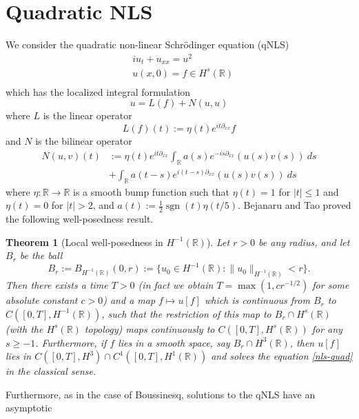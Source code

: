 \documentclass[12pt,reqno]{amsart}
\numberwithin{equation}{section}  %
\newcommand{\rr}{\mathbb{R}}
\newtheorem{theorem}{Theorem}[section]
\def\sgn{\operatorname{sgn}}
\newcommand{\R}{\mathbb{R}}
\begin{document}
\section{Quadratic NLS}
%
  We consider the quadratic non-linear Schr\"odinger equation (qNLS)
\begin{equation}\label{nls-quad}
\begin{split}
& i u_t + u_{xx} = u^2\\
& u(x, 0) = f \in H^s(\R) \\
\end{split}
\end{equation}
which has the localized integral formulation 
\begin{equation}\label{uln-2}
 u = L(f) + N(u,u)
 \end{equation}
where $L$ is the linear operator
\begin{equation}\label{Ldef}
  L(f)(t) := \eta(t) e^{it\partial_{xx}} f
\end{equation}
and $N$ is the bilinear operator
\begin{equation}\label{Ndef}
\begin{split}
N(u,v)(t) &:=
\eta(t) e^{it\partial_{xx}} \int_\R a(s) e^{-is\partial_{xx}}(u(s)v(s))\ ds\\
&+ \int_\R a(t-s) e^{i(t-s)\partial_{xx}}(u(s) v(s))\ ds
\end{split}
\end{equation}
%
where $\eta: \R \to \R$ is a smooth bump function such that $\eta(t) = 1$ for
$|t| \leq 1$ and $\eta(t) = 0$ for $|t| > 2$, and $a(t) := \frac{1}{2}
\sgn(t)\eta(t/5)$.  
%
Bejanaru and Tao proved the following well-posedness result.
\begin{theorem}[Local well-posedness in $H^{-1}(\R)$]\label{lwp}
Let $r > 0$ be any radius, and let $B_r$ be the ball
$$ B_r := B_{H^{-1}(\R)}(0,r) := \{ u_0 \in H^{-1}(\R): \| u_0 \|_{H^{-1}(\R)} < r \}.$$
Then there exists a time $T > 0$ (in fact we obtain $T = \max(1, c r^{-1/2} )$ for some absolute constant $c>0$)
and a map $f \mapsto u[f]$ which is continuous from $B_r$ to $C([0,T],
H^{-1}(\rr))$, such that the
restriction of this map to $B_r \cap H^s(\R)$ (with the $H^s(\R)$ topology) maps continuously 
to $C([0,T], H^s(\rr))$ for any $s \geq -1$.  Furthermore, if $f$ lies in
a smooth space, say $B_r \cap H^3(\R)$, then $u[f]$ lies in $C([0, T], H^3) \cap
C^1([0,T], H^1(\rr))$ and
solves the equation \eqref{nls-quad} in the classical sense.   
\end{theorem}
%
%
Furthermore, as in the case of Boussinesq, solutions to the qNLS have an asymptotic
\end{document}
